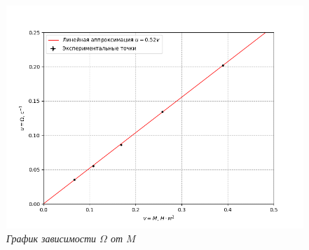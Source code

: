 \documentclass[a4paper,12pt]{article}
\begin{document}
\begin{figure}[h!]
    \includegraphics[width=1\textwidth]{graph.png}
    \caption{\textit{График зависимости $\Omega$ от $M$}}
    \label{omega-M}
\end{figure}
\end{document}
